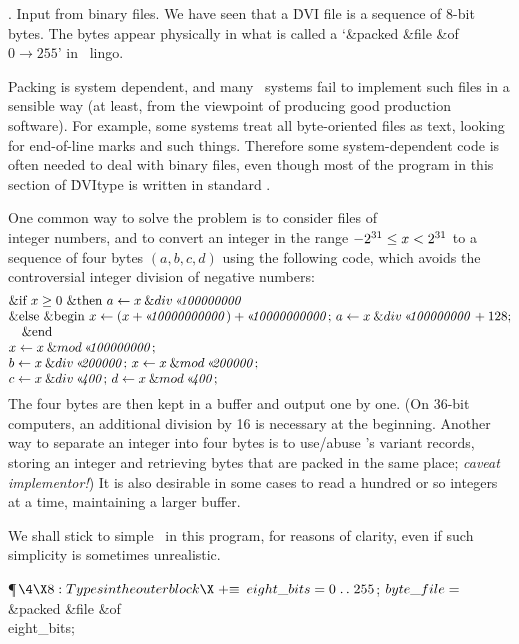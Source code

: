 \fi

.  Input from binary files.
We have seen that a \.{DVI} file is a sequence of 8-bit bytes. The bytes
appear physically in what is called a `\&{packed} \&{file} \&{of} $0\to255$'
in \PASCAL\ lingo.

Packing is system dependent, and many \PASCAL\ systems fail to implement
such files in a sensible way (at least, from the viewpoint of producing
good production software).  For example, some systems treat all
byte-oriented files as text, looking for end-of-line marks and such
things. Therefore some system-dependent code is often needed to deal with
binary files, even though most of the program in this section of
\.{DVItype} is written in standard \PASCAL.

One common way to solve the problem is to consider files of \\{integer}
numbers, and to convert an integer in the range $-2^{31}\L x<2^{31}$ to
a sequence of four bytes $(a,b,c,d)$ using the following code, which
avoids the controversial integer division of negative numbers:
$$\vbox{\halign{#\hfil\cr
 \&{if} $\|x\G0$ \&{then} $\|a\K\|x\mathbin{\&{div}}\O{100000000}$\cr
  \&{else}  \&{begin} $\|x\K(\|x+\O{10000000000})+\O{10000000000}$; $\|a\K\|x%
\mathbin{\&{div}}\O{100000000}+128$;\cr
\quad  \&{end} \cr
$\|x\K\|x\mathbin{\&{mod}}\O{100000000}$;\cr
$\|b\K\|x\mathbin{\&{div}}\O{200000}$; $\|x\K\|x\mathbin{\&{mod}}\O{200000}$;%
\cr
$\|c\K\|x\mathbin{\&{div}}\O{400}$; $\|d\K\|x\mathbin{\&{mod}}\O{400}$;\cr}}$$
The four bytes are then kept in a buffer and output one by one. (On 36-bit
computers, an additional division by 16 is necessary at the beginning.
Another way to separate an integer into four bytes is to use/abuse
\PASCAL's variant records, storing an integer and retrieving bytes that are
packed in the same place; {\sl caveat implementor!\/}) It is also desirable
in some cases to read a hundred or so integers at a time, maintaining a
larger buffer.

We shall stick to simple \PASCAL\ in this program, for reasons of clarity,
even if such simplicity is sometimes unrealistic.

\Y\P$\4\X8:Types in the outer block\X\mathrel{+}\S$\6
$\\{eight\_bits}=0\to255$;\6
$\\{byte\_file}=$\1\5
\&{packed} \&{file} \1\&{of}\5
\\{eight\_bits};\2\2\par
\fi

